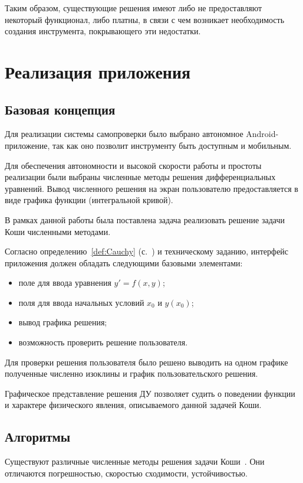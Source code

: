 \documentclass[14pt,russian]{extarticle}
\begin{document}
Таким образом, существующие решения имеют либо не предоставляют некоторый функционал, либо платны, в связи с чем возникает необходимость создания инструмента, покрывающего эти недостатки.

\section{Реализация приложения}

\subsection{Базовая концепция}
Для реализации системы самопроверки было выбрано автономное Android-приложение, так как оно позволит инструменту быть доступным и мобильным.

Для обеспечения автономности и высокой скорости работы и простоты реализации были выбраны численные методы решения дифференциальных уравнений. Вывод численного решения на экран пользователю предоставляется в виде графика функции (интегральной кривой).

В рамках данной работы была поставлена задача реализовать решение задачи Коши численными методами.

Согласно определению~\ref{def:Cauchy} (с.~\pageref{def:Cauchy}) и техническому заданию, интерфейс приложения должен обладать следующими базовыми элементами:
\begin{itemize}
\item поле для ввода уравнения $y'=f(x, y)$;
\item поля для ввода начальных условий $x_0$ и $y(x_0)$;
\item вывод графика решения;
\item возможность проверить решение пользователя.
\end{itemize}

Для проверки решения пользователя было решено выводить на одном графике полученные численно изоклины и график пользовательского решения.

Графическое представление решения ДУ позволяет судить о поведении функции и характере физического явления, описываемого данной задачей Коши.

\subsection{Алгоритмы}

Существуют различные численные методы решения задачи Коши~\mbox{\cite[cc.~410-481]{cite:Amosov}}. Они отличаются погрешностью, скоростью сходимости, устойчивостью.
\end{document}
